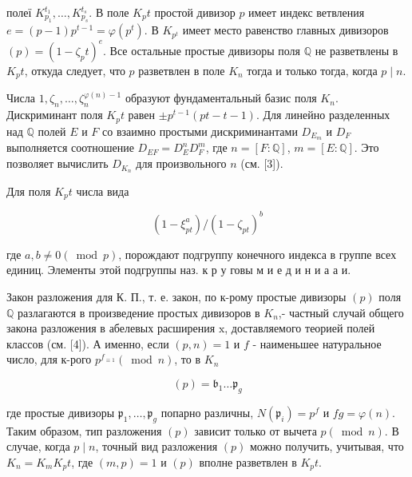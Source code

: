 \documentclass[10pt]{article}
\begin{document}
полеї $K_{p_{1}}^{t_{1}}, \ldots, K_{p_{s}}^{t_{s}}$. В поле $K_{p} t$ простой дивизор $p$ имеет индекс ветвления $e=(p-1) p^{t-1}=\varphi\left(p^{t}\right)$. В $K_{p^{t}}$ имеет место равенство главных дивизоров $(p)=\left(1-\zeta_{p} t\right)^{e}$. Все остальные простые дивизоры поля $\mathbb{Q}$ не разветвлены в $K_{p} t$, откуда следует, что $p$ разветвлен в поле $K_{n}$ тогда и только тогда, когда $p \mid n$.



Числа $1, \zeta_{n}, \ldots, \zeta_{n}^{\varphi(n)-1}$ образуют фундаментальный базис поля $K_{n}$. Дискриминант поля $K_{p} t$ равен $\pm p^{t-1}(p t-t-1)$. Для линейно разделенных над $\mathbb{Q}$ полей $E$ и $F$ со взаимно простыми дискриминантами $D_{E_{m}}$ и $D_{F}$ выполняется соотношение $D_{E F}=D_{E}^{n} D_{F}^{m}$, где $n=[F: \mathbb{Q}]$, $m=[E: \mathbb{Q}]$. Это позволяет вычислить $D_{K_{n}}$ для произвольного $n$ (см. [3]).



Для поля $K_{p} t$ числа вида



\[

\left(1-\xi_{p t}^{a}\right) /\left(1-\zeta_{p t}\right)^{b}

\]



где $a, b \neq 0(\bmod p)$, порождают подгруппу конечного индекса в группе всех единиц. Элементы этой подгруппы наз. к р у говы м и е д и н и а а и.



Закон разложения для К. П., т. е. закон, по к-рому простые дивизоры $(p)$ поля $\mathbb{Q}$ разлагаются в произведение простых дивизоров в $K_{n}$,- частный случай общего закона разложения в абелевых расширения $\mathrm{x}$, доставляемого теорией полей классов (см. [4]). А именно, если $(p, n)=1$ и $f$ - наименьшее натуральное число, для к-рого $p^{f_{\equiv 1}}(\bmod n)$, то в $K_{n}$



\[

(p)=\mathfrak{b}_{1} \ldots \mathfrak{p}_{g}

\]



где простые дивизоры $\mathfrak{p}_{1}, \ldots, \mathfrak{p}_{g}$ попарно различны, $N\left(\mathfrak{p}_{i}\right)=p^{f}$ и $f g=\varphi(n)$. Таким образом, тип разложения $(p)$ зависит только от вычета $p(\bmod n)$. В случае, когда $p \mid n$, точный вид разложения $(p)$ можно получить, учитывая, что $K_{n}=K_{m} K_{p} t$, где $(m, p)=1$ и $(p)$ вполне разветвлен в $K_{p} t$.
\end{document}
